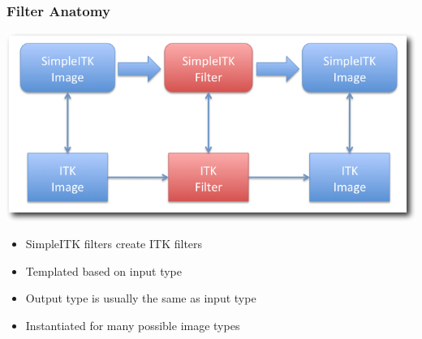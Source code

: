 \begin{frame}[fragile]
\frametitle{Filter Anatomy}
\begin{center}
  \includegraphics[width=.8\textwidth]{Images/FilterOverview_shadow}
\end{center}
\begin{itemize}
  \item SimpleITK filters create ITK filters
  \item Templated based on input type
  \item Output type is usually the same as input type
  \item Instantiated for many possible image types
\end{itemize}
\end{frame}

